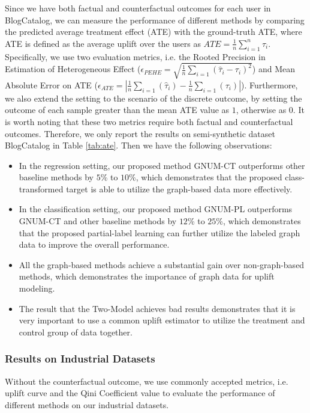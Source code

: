 Since we have both factual and counterfactual outcomes for each user in BlogCatalog, we can measure the performance of different methods by comparing the predicted average treatment effect (ATE) with the ground-truth ATE, where ATE is defined as the average uplift over the users as $ATE=\frac{1}{n} \sum_{i=1}^n \tau_i$. Specifically, we use two evaluation metrics, i.e. the Rooted Precision in Estimation of Heterogeneous Effect ($\epsilon_{P E H E}=\sqrt{\frac{1}{n} \sum_{i=1}\left(\hat{\tau}_i-\tau_i\right)^2}$) and Mean Absolute Error on ATE ($\epsilon_{A T E}=\left|\frac{1}{n} \sum_{i=1}\left(\hat{\tau}_i\right)-\frac{1}{n} \sum_{i=1}\left(\tau_i\right)\right|$). Furthermore, we also extend the setting to the scenario of the discrete outcome, by setting the outcome of each sample greater than the mean ATE value as $1$, otherwise as $0$. It is worth noting that these two metrics require both factual and counterfactual outcomes. Therefore, we only report the results on semi-synthetic dataset BlogCatalog in Table \ref{tab:ate}. Then we have the following observations:
\begin{itemize}
    \item In the regression setting, our proposed method GNUM-CT outperforms other baseline methods by $5$\% to $10$\%, which demonstrates that the proposed class-transformed target is able to utilize the graph-based data more effectively. 
    \item In the classification setting, our proposed method GNUM-PL outperforms GNUM-CT and other baseline methods by $12$\% to $25$\%, which demonstrates that the proposed partial-label learning can further utilize the labeled graph data to improve the overall performance. 
    \item All the graph-based methods achieve a substantial gain over non-graph-based methods, which demonstrates the importance of graph data for uplift modeling. 
    \item The result that the Two-Model achieves bad results demonstrates that it is very important to use a common uplift estimator to utilize the treatment and control group of data together. 
\end{itemize}

\subsubsection{Results on Industrial Datasets}
\label{sec:uplift_curve}
Without the counterfactual outcome, we use commonly accepted metrics, i.e. uplift curve and the Qini Coefficient value to evaluate the performance of different methods on our industrial datasets. 

